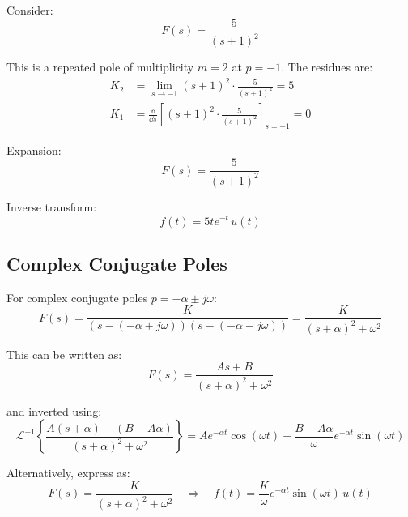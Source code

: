 \begin{examplebox}[title=Example: Repeated Real Poles]

Consider:
\begin{equation*}
    F(s) = \frac{5}{(s+1)^2}
\end{equation*}

This is a repeated pole of multiplicity $m=2$ at $p=-1$. The residues are:
\begin{align*}
    K_2 &= \lim_{s \to -1} (s+1)^2 \cdot \frac{5}{(s+1)^2} = 5 \\
    K_1 &= \frac{\dd}{\dd s}\left[ (s+1)^2 \cdot \frac{5}{(s+1)^2} \right]_{s=-1} = 0
\end{align*}

Expansion:
\begin{equation*}
    F(s) = \frac{5}{(s+1)^2}
\end{equation*}

Inverse transform:
\begin{equation*}
    f(t) = 5t e^{-t} \, u(t)
\end{equation*}

\end{examplebox}

\subsection{Complex Conjugate Poles}
\label{subsec:complex_poles}

For complex conjugate poles $p = -\alpha \pm j\omega$:
\begin{equation}
    F(s) = \frac{K}{(s - (-\alpha + j\omega))(s - (-\alpha - j\omega))} = \frac{K}{(s+\alpha)^2 + \omega^2}
\end{equation}

This can be written as:
\begin{equation}
    F(s) = \frac{As + B}{(s+\alpha)^2 + \omega^2}
\end{equation}

and inverted using:
\begin{equation}
    \mathcal{L}^{-1}\left\{\frac{A(s+\alpha) + (B - A\alpha)}{(s+\alpha)^2 + \omega^2}\right\} = A e^{-\alpha t}\cos(\omega t) + \frac{B - A\alpha}{\omega} e^{-\alpha t}\sin(\omega t)
\end{equation}

Alternatively, express as:
\begin{equation}
    F(s) = \frac{K}{(s+\alpha)^2 + \omega^2} \quad \Rightarrow \quad f(t) = \frac{K}{\omega} e^{-\alpha t} \sin(\omega t) \, u(t)
\end{equation}

